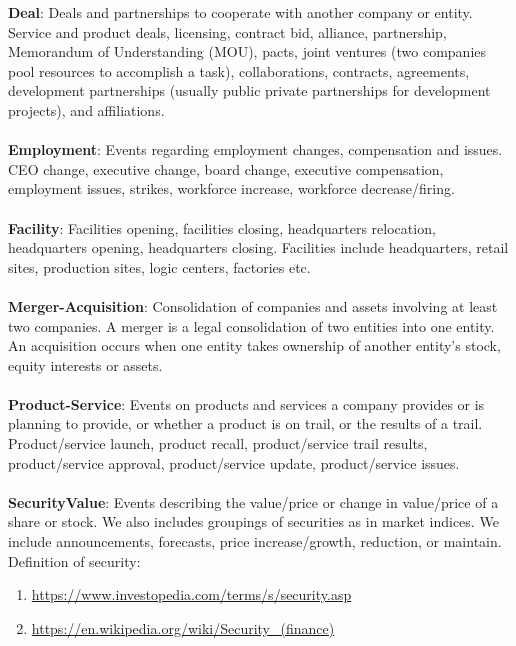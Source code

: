 \documentclass[a4paper]{report}
\begin{document}
\noindent\textbf{Deal}:
Deals and partnerships to cooperate with another company or entity. Service and product deals, licensing, contract bid, alliance, partnership, Memorandum of Understanding (MOU), pacts, joint ventures (two companies pool resources to accomplish a task), collaborations, contracts, agreements, development partnerships (usually public private partnerships for development projects), and affiliations.
\\\\
\noindent\textbf{Employment}:
Events regarding employment changes, compensation and issues.
CEO change, executive change, board change, executive compensation, employment issues, strikes, workforce increase, workforce decrease/firing.
\\\\
\noindent\textbf{Facility}:
Facilities opening, facilities closing, headquarters relocation, headquarters opening, headquarters closing. Facilities include headquarters, retail sites, production sites, logic centers, factories etc.
\\\\
\noindent\textbf{Merger-Acquisition}:
Consolidation of companies and assets involving at least two companies. A merger is a legal consolidation of two entities into one entity. An acquisition occurs when one entity takes ownership of another entity's stock, equity interests or assets.
\\\\
\noindent\textbf{Product-Service}:
Events on products and services a company provides or is planning to provide, or whether a product is on trail, or the results of a trail. Product/service launch, product recall, product/service trail results, product/service approval, product/service update, product/service issues.
\\\\
\noindent\textbf{SecurityValue}:
Events describing the value/price or change in value/price of a share or stock. We also includes groupings of securities as in market indices. We include announcements, forecasts, price increase/growth, reduction, or maintain.
\\
Definition of security:
\begin{enumerate}
    \item \small{\url{https://www.investopedia.com/terms/s/security.asp}}
    \item \url{https://en.wikipedia.org/wiki/Security_(finance)}
\end{enumerate}
\end{document}
